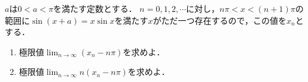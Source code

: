 \documentclass[../../main.tex]{subfiles}
\begin{document}
$a$は$0<a<\pi$を満たす定数とする．
$n=0,1,2,\cdots$に対し，$n\pi < x < (n+1)\pi$の範囲に$\sin(x+a)=x\sin x$を満たす$x$がただ一つ存在するので，この値を$x_n$とする．
\begin{enumerate}
  \item 極限値${\displaystyle \lim_{n\to\infty}(x_n-n\pi)}$を求めよ．
  \item 極限値${\displaystyle \lim_{n\to\infty}n(x_n-n\pi)}$を求めよ．
\end{enumerate}
\end{document}
